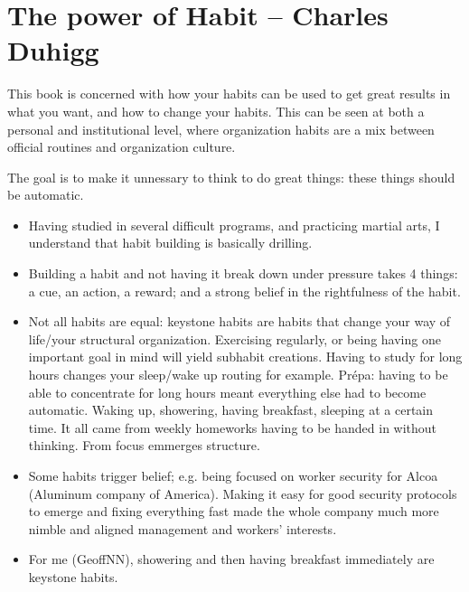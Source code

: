 \section{The power of Habit -- Charles Duhigg}

This book is concerned with how your habits can be used to get great results in what you want, and how to change your habits.
This can be seen at both a personal and institutional level, where organization habits are a mix between official routines and organization culture.

The goal is to make it unnessary to think to do great things: these things should be automatic.

\begin{itemize}
    \item Having studied in several difficult programs, and practicing martial arts, I understand that habit building is basically drilling. 
    \item Building a habit and not having it break down under pressure takes 4 things: a cue, an action, a reward; and a strong belief in the rightfulness of the habit.
    \item Not all habits are equal: keystone habits are habits that change your way of life/your structural organization.
    Exercising regularly, or being having one important goal in mind will yield subhabit creations.
    Having to study for long hours changes your sleep/wake up routing for example.
    Prépa: having to be able to concentrate for long hours meant everything else had to become automatic.
    Waking up, showering, having breakfast, sleeping at a certain time.
    It all came from weekly homeworks having to be handed in without thinking.
    From focus emmerges structure.
    \item Some habits trigger belief; e.g. being focused on worker security for Alcoa (Aluminum company of America).
    Making it easy for good security protocols to emerge and fixing everything fast made the whole company much more nimble and aligned management and workers' interests.
    \item For me (GeoffNN), showering and then having breakfast immediately are keystone habits. 
\end{itemize}